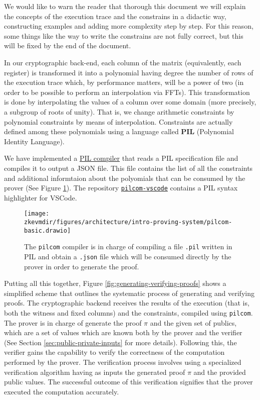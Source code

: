\begin{bremark}
We would like to warn the reader that thorough this document we will explain the concepts of the execution trace and the constrains in a didactic way, constructing examples and adding more complexity step by step. For this reason, some things like the way to write the constrains are not fully correct, but this will be fixed by the end of the document.
\end{bremark}

In our cryptographic back-end, each column of the matrix (equivalently, each register) is transformed it into a polynomial having degree the number of rows of the execution trace which, by performance matters, will be a power of two (in order to be possible to perform an interpolation via FFTs). This transformation is done by interpolating the values of a column over some domain (more precisely, a subgroup of roots of unity). That is, we change arithmetic constraints by polynomial constraints by means of interpolation. Constraints are actually defined among these polynomials using a language called  \textbf{PIL} (Polynomial Identity Language).

We have implemented a \href{https://github.com/0xPolygonHermez/pilcom}{PIL compiler} that reads a PIL specification file and compiles it to output a JSON file. This file contains the list of all the constraints and additional informtaion about the polyomials that can be consumed by the prover (See Figure \ref{fig:pilcom}). The repository \href{https://github.com/0xPolygonHermez/pilcom-vscode}{\texttt{pilcom-vscode}} contains a PIL syntax highlighter for VSCode.

\begin{figure}[H]
\centering
\texttt{[image: \\zkevmdir/figures/architecture/intro-proving-system/pilcom-basic.drawio]}
\caption{The \texttt{pilcom} compiler is in charge of compiling a file \texttt{.pil} written in PIL and obtain a \texttt{.json} file which will be consumed directly by the prover in order to generate the proof. }
\label{fig:pilcom}
\end{figure}

Putting all this together, Figure \ref{fig:generating-verifying-proofs} shows a simplified scheme that outlines the systematic process of generating and verifying proofs. The cryptographic backend receives the results of the execution (that is, both the witness and fixed columns) and the constraints, compiled using \texttt{pilcom}. The prover is in charge of generate the proof $\pi$ and the given set of publics, which are a set of values which are known both by the prover and the verifier (See Section \ref{sec:public-private-inputs} for more details). Following this, the verifier gains the capability to verify the correctness of the computation performed by the prover. The verification process involves using a specialized verification algorithm having as inputs the generated proof $\pi$ and the provided public values. The successful outcome of this verification signifies that the prover executed the computation accurately.

